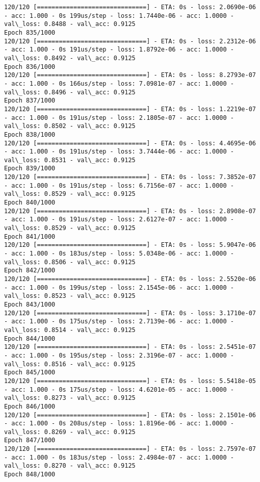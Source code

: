 \documentclass[11pt]{article}
\begin{document}
\begin{Verbatim}[commandchars=\\\{\}]
120/120 [==============================] - ETA: 0s - loss: 2.0690e-06 - acc: 1.000 - 0s 199us/step - loss: 1.7440e-06 - acc: 1.0000 - val\_loss: 0.8488 - val\_acc: 0.9125
Epoch 835/1000
120/120 [==============================] - ETA: 0s - loss: 2.2312e-06 - acc: 1.000 - 0s 191us/step - loss: 1.8792e-06 - acc: 1.0000 - val\_loss: 0.8492 - val\_acc: 0.9125
Epoch 836/1000
120/120 [==============================] - ETA: 0s - loss: 8.2793e-07 - acc: 1.000 - 0s 166us/step - loss: 7.0981e-07 - acc: 1.0000 - val\_loss: 0.8496 - val\_acc: 0.9125
Epoch 837/1000
120/120 [==============================] - ETA: 0s - loss: 1.2219e-07 - acc: 1.000 - 0s 191us/step - loss: 2.1805e-07 - acc: 1.0000 - val\_loss: 0.8502 - val\_acc: 0.9125
Epoch 838/1000
120/120 [==============================] - ETA: 0s - loss: 4.4695e-06 - acc: 1.000 - 0s 191us/step - loss: 3.7444e-06 - acc: 1.0000 - val\_loss: 0.8531 - val\_acc: 0.9125
Epoch 839/1000
120/120 [==============================] - ETA: 0s - loss: 7.3852e-07 - acc: 1.000 - 0s 191us/step - loss: 6.7156e-07 - acc: 1.0000 - val\_loss: 0.8529 - val\_acc: 0.9125
Epoch 840/1000
120/120 [==============================] - ETA: 0s - loss: 2.8908e-07 - acc: 1.000 - 0s 191us/step - loss: 2.6127e-07 - acc: 1.0000 - val\_loss: 0.8529 - val\_acc: 0.9125
Epoch 841/1000
120/120 [==============================] - ETA: 0s - loss: 5.9047e-06 - acc: 1.000 - 0s 183us/step - loss: 5.0348e-06 - acc: 1.0000 - val\_loss: 0.8506 - val\_acc: 0.9125
Epoch 842/1000
120/120 [==============================] - ETA: 0s - loss: 2.5520e-06 - acc: 1.000 - 0s 199us/step - loss: 2.1545e-06 - acc: 1.0000 - val\_loss: 0.8523 - val\_acc: 0.9125
Epoch 843/1000
120/120 [==============================] - ETA: 0s - loss: 3.1710e-07 - acc: 1.000 - 0s 175us/step - loss: 2.7139e-06 - acc: 1.0000 - val\_loss: 0.8514 - val\_acc: 0.9125
Epoch 844/1000
120/120 [==============================] - ETA: 0s - loss: 2.5451e-07 - acc: 1.000 - 0s 195us/step - loss: 2.3196e-07 - acc: 1.0000 - val\_loss: 0.8516 - val\_acc: 0.9125
Epoch 845/1000
120/120 [==============================] - ETA: 0s - loss: 5.5418e-05 - acc: 1.000 - 0s 175us/step - loss: 4.6201e-05 - acc: 1.0000 - val\_loss: 0.8273 - val\_acc: 0.9125
Epoch 846/1000
120/120 [==============================] - ETA: 0s - loss: 2.1501e-06 - acc: 1.000 - 0s 208us/step - loss: 1.8196e-06 - acc: 1.0000 - val\_loss: 0.8269 - val\_acc: 0.9125
Epoch 847/1000
120/120 [==============================] - ETA: 0s - loss: 2.7597e-07 - acc: 1.000 - 0s 183us/step - loss: 2.4984e-07 - acc: 1.0000 - val\_loss: 0.8270 - val\_acc: 0.9125
Epoch 848/1000

\end{Verbatim}
\end{document}
